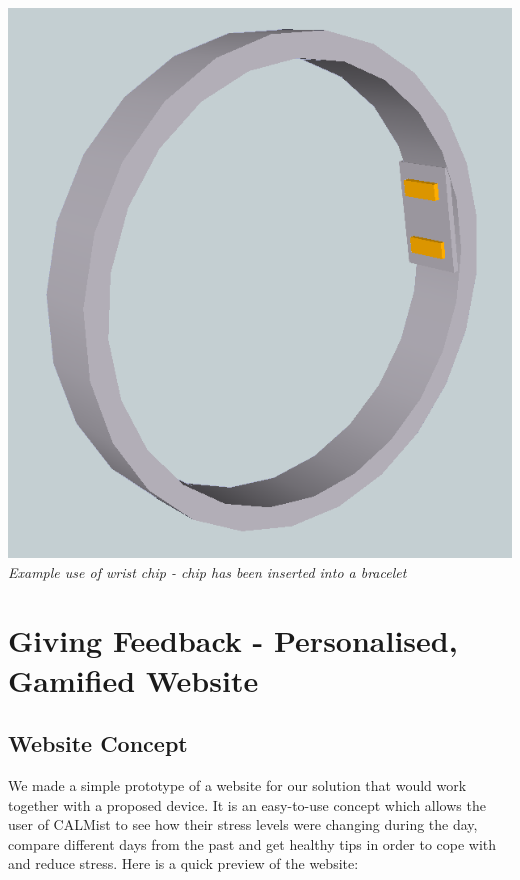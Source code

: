 \documentclass{scrartcl}
\begin{document}
\begin{center}
	\begin{minipage}{0.4\textwidth}
		\begin{center}
			\includegraphics[scale=0.2]{img/hardware/Bracelet_02.png}\\
			\emph{Example use of wrist chip - chip has been inserted into a bracelet}
		\end{center}
	\end{minipage}
\end{center}

\section{Giving Feedback - Personalised, Gamified Website}

\subsection{Website Concept}

We made a simple prototype of a website for our solution that would work together with a proposed device. It is an easy-to-use concept which allows the user of CALMist to see how their stress levels were changing during the day, compare different days from the past and get healthy tips in order to cope with and reduce stress. Here is a quick preview of the website:
\end{document}
